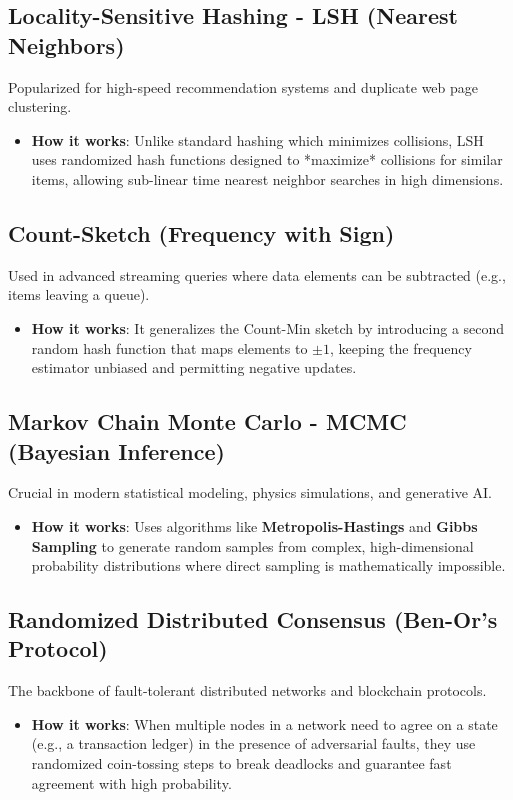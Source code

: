 \documentclass[twoside,12pt]{book}
\theoremstyle{plain}
\theoremstyle{definition}
\theoremstyle{remark}
\begin{document}
\subsection{Locality-Sensitive Hashing - LSH (Nearest Neighbors)}
Popularized for high-speed recommendation systems and duplicate web page clustering.
\begin{itemize}
    \item \textbf{How it works}: Unlike standard hashing which minimizes collisions, LSH uses randomized hash functions designed to *maximize* collisions for similar items, allowing sub-linear time nearest neighbor searches in high dimensions.
\end{itemize}

\subsection{Count-Sketch (Frequency with Sign)}
Used in advanced streaming queries where data elements can be subtracted (e.g., items leaving a queue).
\begin{itemize}
    \item \textbf{How it works}: It generalizes the Count-Min sketch by introducing a second random hash function that maps elements to $\pm 1$, keeping the frequency estimator unbiased and permitting negative updates.
\end{itemize}

\subsection{Markov Chain Monte Carlo - MCMC (Bayesian Inference)}
Crucial in modern statistical modeling, physics simulations, and generative AI.
\begin{itemize}
    \item \textbf{How it works}: Uses algorithms like \textbf{Metropolis-Hastings} and \textbf{Gibbs Sampling} to generate random samples from complex, high-dimensional probability distributions where direct sampling is mathematically impossible.
\end{itemize}

\subsection{Randomized Distributed Consensus (Ben-Or's Protocol)}
The backbone of fault-tolerant distributed networks and blockchain protocols.
\begin{itemize}
    \item \textbf{How it works}: When multiple nodes in a network need to agree on a state (e.g., a transaction ledger) in the presence of adversarial faults, they use randomized coin-tossing steps to break deadlocks and guarantee fast agreement with high probability.
\end{itemize}

\backmatter

\printindex
\end{document}
